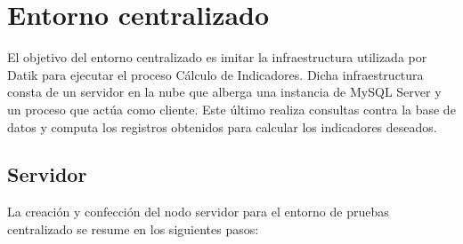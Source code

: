 \section{Entorno centralizado}

El objetivo del entorno centralizado es imitar la infraestructura utilizada por Datik para ejecutar el proceso Cálculo de Indicadores. Dicha infraestructura consta de un servidor en la nube que alberga una instancia de MySQL Server y un proceso que actúa como cliente. Este último realiza consultas contra la base de datos y computa los registros obtenidos para calcular los indicadores deseados.

\clearpage

\subsection{Servidor}

La creación y confección del nodo servidor para el entorno de pruebas centralizado se resume en los siguientes pasos:

